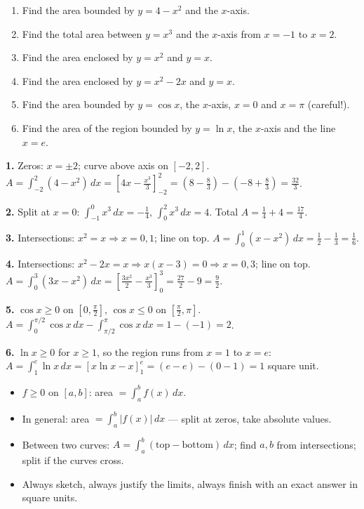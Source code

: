 \documentclass[11pt]{article}
\begin{document}
\begin{exercice}[Practice]
\begin{enumerate}
\item Find the area bounded by $y = 4 - x^2$ and the $x$-axis.
\item Find the total area between $y = x^3$ and the $x$-axis from $x = -1$ to $x = 2$.
\item Find the area enclosed by $y = x^2$ and $y = x$.
\item Find the area enclosed by $y = x^2 - 2x$ and $y = x$.
\item Find the area bounded by $y = \cos x$, the $x$-axis, $x = 0$ and $x = \pi$ (careful!).
\item Find the area of the region bounded by $y = \ln x$, the $x$-axis and the line $x = e$.
\end{enumerate}
\end{exercice}

\begin{corrige}[Exercises 1--6]
\textbf{1.} Zeros: $x = \pm 2$; curve above axis on $[-2,2]$. $A = \int_{-2}^{2}(4 - x^2)\,dx = \left[4x - \tfrac{x^3}{3}\right]_{-2}^{2} = \left(8 - \tfrac83\right) - \left(-8 + \tfrac83\right) = \tfrac{32}{3}$.

\textbf{2.} Split at $x = 0$: $\int_{-1}^{0} x^3\,dx = -\tfrac14$, $\int_0^2 x^3\,dx = 4$. Total $A = \tfrac14 + 4 = \tfrac{17}{4}$.

\textbf{3.} Intersections: $x^2 = x \Rightarrow x = 0, 1$; line on top. $A = \int_0^1 (x - x^2)\,dx = \tfrac12 - \tfrac13 = \tfrac16$.

\textbf{4.} Intersections: $x^2 - 2x = x \Rightarrow x(x - 3) = 0 \Rightarrow x = 0, 3$; line on top. $A = \int_0^3 (3x - x^2)\,dx = \left[\tfrac{3x^2}{2} - \tfrac{x^3}{3}\right]_0^3 = \tfrac{27}{2} - 9 = \tfrac92$.

\textbf{5.} $\cos x \geq 0$ on $[0, \tfrac{\pi}{2}]$, $\cos x \leq 0$ on $[\tfrac{\pi}{2}, \pi]$. $A = \int_0^{\pi/2}\cos x\,dx - \int_{\pi/2}^{\pi}\cos x\,dx = 1 - (-1) = 2$.

\textbf{6.} $\ln x \geq 0$ for $x \geq 1$, so the region runs from $x = 1$ to $x = e$: $A = \int_1^e \ln x\,dx = \left[x\ln x - x\right]_1^e = (e - e) - (0 - 1) = 1$ square unit.
\end{corrige}

\begin{aretenir}
\begin{itemize}
\item $f \geq 0$ on $[a,b]$: area $= \displaystyle\int_a^b f(x)\,dx$.
\item In general: area $= \displaystyle\int_a^b |f(x)|\,dx$ — split at zeros, take absolute values.
\item Between two curves: $A = \displaystyle\int_a^b (\text{top} - \text{bottom})\,dx$; find $a, b$ from intersections; split if the curves cross.
\item Always sketch, always justify the limits, always finish with an exact answer in square units.
\end{itemize}
\end{aretenir}
\end{document}
